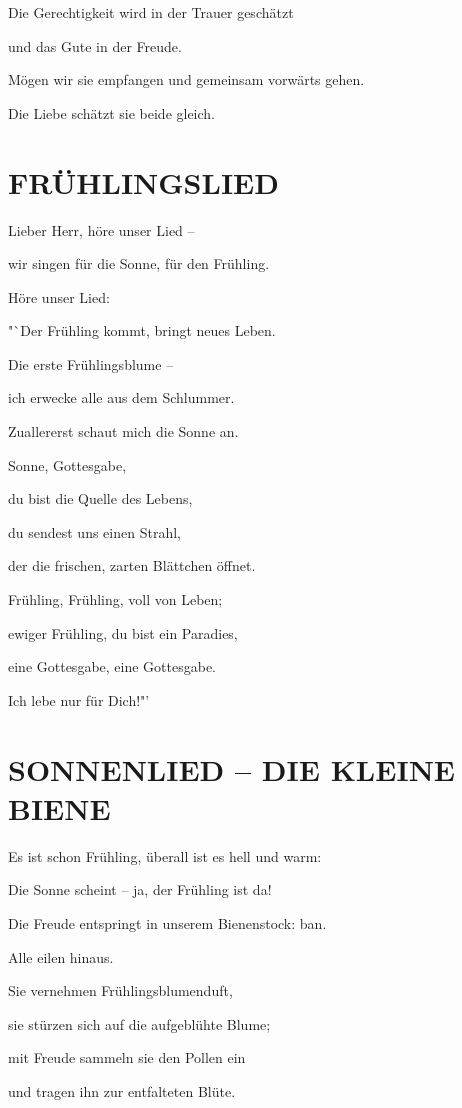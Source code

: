 \documentclass[11pt,a5paper,twoside]{article}
\begin{document}
Die Gerechtigkeit wird in der Trauer geschätzt

und das Gute in der Freude. 

Mögen wir sie empfangen und gemeinsam vorwärts gehen.

Die Liebe schätzt sie beide gleich.

\section[Frühlingslied]{FRÜHLINGSLIED}

Lieber Herr, höre unser Lied --

wir singen für die Sonne, für den Frühling.

Höre unser Lied:

"`Der Frühling kommt, bringt neues Leben. 

Die erste Frühlingsblume -- 

ich erwecke alle aus dem Schlummer. 

Zuallererst schaut mich die Sonne an.

Sonne, Gottesgabe, 

du bist die Quelle des Lebens, 

du sendest uns einen Strahl, 

der die frischen, zarten Blättchen öffnet.

Frühling, Frühling, voll von Leben; 

ewiger Frühling, du bist ein Paradies, 

eine Gottesgabe, eine Gottesgabe.

Ich lebe nur für Dich!"'

\section[Sonnenlied -- die kleine Biene]{SONNENLIED -- DIE KLEINE BIENE}

Es ist schon Frühling, überall ist es hell und warm:

Die Sonne scheint -- ja, der Frühling ist da! 

Die Freude entspringt in unserem Bienenstock: ban. 

Alle eilen hinaus. 

Sie vernehmen Frühlingsblumenduft, 

sie stürzen sich auf die aufgeblühte Blume; 

mit Freude sammeln sie den Pollen ein 

und tragen ihn zur entfalteten Blüte.
\end{document}
